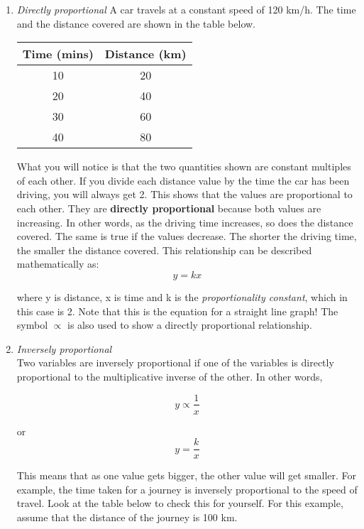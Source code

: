 \begin{enumerate}

\item{\textit{Directly proportional}
A car travels at a constant speed of 120 km/h. The time and the distance covered are shown in the table below.

\begin{center}
\begin{tabular}{|c|c|}\hline
\textbf{Time} (mins) & \textbf{Distance} (km) \\\hline
10 & 20 \\\hline
20 & 40 \\\hline
30 & 60 \\\hline
40 & 80 \\\hline
\end{tabular}
\end{center}

What you will notice is that the two quantities shown are constant multiples of each other. If you divide each distance value by the time the car has been driving, you will always get 2. This shows that the values are proportional to each other. They are \textbf{directly proportional} because both values are increasing. In other words, as the driving time increases, so does the distance covered. The same is true if the values decrease. The shorter the driving time, the smaller the distance covered. This relationship can be described mathematically as:
\begin{equation*}
y = kx
\end{equation*}

where y is distance, x is time and k is the \textit{proportionality constant}, which in this case is 2. Note that this is the equation for a straight line graph! The symbol $\propto$ is also used to show a directly proportional relationship.}

\item{\textit{Inversely proportional\\}
Two variables are inversely proportional if one of the variables is directly proportional to the multiplicative inverse of the other. In other words,

\begin{equation*}
y \propto \frac{1}{x}
\end{equation*}

or \begin{equation*}
y = \frac{k}{x}
\end{equation*}

This means that as one value gets bigger, the other value will get smaller. For example, the time taken for a journey is inversely proportional to the speed of travel. Look at the table below to check this for yourself. For this example, assume that the distance of the journey is 100 km.

}
\end{enumerate}
